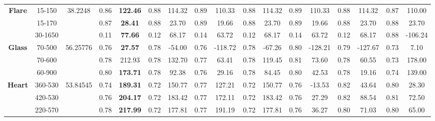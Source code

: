 \documentclass[letterpaper]{article}
\theoremstyle{definition}
\begin{document}
\begin{table}
\begin{tabular}{|c|c|c|c|c|c|c|c|c|c|c|c|c|c|c|c|c|}
\multirow{3}{*}{\textbf{Flare}}     & 15-150    & 38.2248   & 0.86  & \textbf{122.46}  & 0.88      & 114.32       & 0.89   & 110.33            & 0.88      & 114.32       & 0.89   & 110.33          & 0.88     & 114.32             & 0.87   & 110.00           \\ \cline{2-17} 
                                    & 15-170    &           & 0.87  & \textbf{28.41}   & 0.88      & 23.70        & 0.89   & 19.66             & 0.88      & 23.70        & 0.89   & 19.66           & 0.88     & 23.70              & 0.88   & 23.70            \\ \cline{2-17} 
                                    & 30-1650   &           & 0.11  & \textbf{77.66}   & 0.12      & 68.17        & 0.14   & 63.72             & 0.12      & 68.17        & 0.14   & 63.72           & 0.12     & 68.17              & 0.88   & -106.24          \\ \hline
\multirow{3}{*}{\textbf{Glass}}     & 70-500    & 56.25776  & 0.76  & \textbf{27.57}   & 0.78      & -54.00       & 0.76   & -118.72           & 0.78      & -67.26       & 0.80   & -128.21         & 0.79     & -127.67            & 0.73   & 7.10             \\ \cline{2-17} 
                                    & 70-600    &           & 0.78  & 212.93           & 0.78      & 132.70       & 0.77   & 63.41             & 0.78      & 119.45       & 0.81   & 73.60           & 0.78     & 60.55              & 0.73   & 178.00           \\ \cline{2-17} 
                                    & 60-900    &           & 0.80  & \textbf{173.71}  & 0.78      & 92.38        & 0.76   & 29.16             & 0.78      & 84.45        & 0.80   & 42.53           & 0.78     & 19.16              & 0.74   & 139.00           \\ \hline
\multirow{3}{*}{\textbf{Heart}}     & 360-530   & 53.84545  & 0.74  & \textbf{189.31}  & 0.72      & 150.77       & 0.77   & 127.21            & 0.72      & 150.77       & 0.76   & -13.53          & 0.82     & 43.64              & 0.80   & 28.30            \\ \cline{2-17} 
                                    & 420-530   &           & 0.76  & \textbf{204.17}  & 0.72      & 183.42       & 0.77   & 172.11            & 0.72      & 183.42       & 0.76   & 27.29           & 0.82     & 88.54              & 0.81   & 72.50            \\ \cline{2-17} 
                                    & 220-570   &           & 0.78  & \textbf{217.99}  & 0.72      & 177.81       & 0.77   & 191.19            & 0.72      & 177.81       & 0.76   & 36.27           & 0.80     & 71.03              & 0.80   & 65.00            \\ \hline

\end{tabular}
\end{table}
\end{document}
